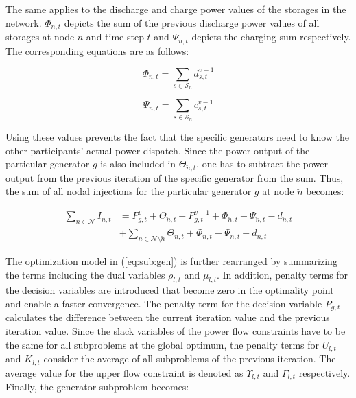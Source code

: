  The same applies to the discharge and charge power values of the storages in the network. $\Phi_{n,t}$ depicts the sum of the previous discharge power values of all storages at node $n$ and time step $t$ and $\Psi_{n,t}$ depicts the charging sum respectively. The corresponding equations are as follows:
 
\begin{equation}
	\Phi_{n,t} = \sum_{s\in\mathcal{S}_n}d_{s,t}^{v-1}
\end{equation}

\begin{equation}
	\Psi_{n,t} = \sum_{s\in\mathcal{S}_n}c_{s,t}^{v-1}
\end{equation}
 
 Using these values prevents the fact that the specific generators need to know the other participants' actual power dispatch. Since the power output of the particular generator $g$ is also included in $\Theta_{\breve{n},t}$, one has to subtract the power output from the previous iteration of the specific generator from the sum. Thus, the sum of all nodal injections for the particular generator $g$ at node $\breve{n}$ becomes: 

 \begin{align}
 	\sum_{n \in \mathcal{N}} I_{n,t} &= P_{g,t}^v + \Theta_{\breve{n},t} - P_{g,t}^{v-1} + \Phi_{\breve{n},t} - \Psi_{\breve{n},t} - d_{\breve{n},t} \\
 	& + \sum_{n \in \mathcal{N} \setminus \breve{n}} \Theta_{n,t} + \Phi_{n,t} - \Psi_{n,t} - d_{n,t} \nonumber
 \end{align}
 
 The optimization model in (\ref{eq:sub:gen}) is further rearranged by summarizing the terms including the dual variables $\rho_{l,t}$ and $\mu_{l,t}$. In addition, penalty terms for the decision variables are introduced that become zero in the optimality point and enable a faster convergence. The penalty term for the decision variable $P_{g,t}$ calculates the difference between the current iteration value and the previous iteration value. Since the slack variables of the power flow constraints have to be the same for all subproblems at the global optimum, the penalty terms for $U_{l,t}$ and $K_{l,t}$ consider the average of all subproblems of the previous iteration. The average value for the upper flow constraint is denoted as $\Upsilon_{l,t}$ and $\Gamma_{l,t}$ respectively. Finally, the generator subproblem becomes:
 
